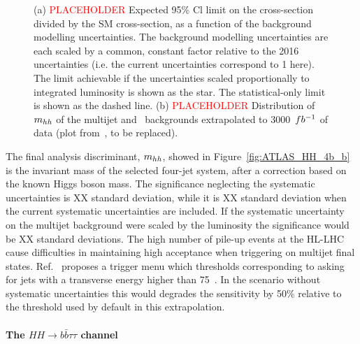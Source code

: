 \begin{figure}[!htb]
\centering 
{} 
\caption{(a) \textcolor{red}{PLACEHOLDER} Expected 95\% Cl limit on the cross-section divided by the SM cross-section, as a function of the background modelling uncertainties. The background modelling uncertainties are each scaled by a common, constant factor relative to the 2016 uncertainties (i.e. the current uncertainties correspond to 1 here). 
The limit achievable if the uncertainties scaled proportionally to integrated luminosity is shown as the star. 
The statistical-only limit is shown as the dashed line. (b) \textcolor{red}{PLACEHOLDER} Distribution of $m_{hh}$ of the multijet and \ttbar\ backgrounds extrapolated to 3000~$fb^{-1}$ of data (plot from~\cite{Aaboud:2018knk}, to be replaced).} 
\label{fig:ATLAS_HH_4b} 
\end{figure}

The final analysis discriminant, $m_{hh}$, showed in Figure~\ref{fig:ATLAS_HH_4b_b} is the invariant mass of the selected four-jet system, after a correction based on the known Higgs boson mass. The significance neglecting the systematic uncertainties is XX standard deviation, while it is XX standard deviation when the current systematic uncertainties are included. If the systematic uncertainty on the multijet background were scaled by the luminosity the significance would be XX standard deviations.
The high number of pile-up events at the HL-LHC cause difficulties in maintaining high acceptance when triggering on multijet final states. Ref.~\cite{Collaboration:2285584} proposes a trigger menu which thresholds corresponding to asking for jets with a transverse energy higher than 75~\UGeV. In the scenario without systematic uncertainties this would degrades the sensitivity by 50\% relative to the threshold used by default in this extrapolation.


%
\paragraph{The $HH \rightarrow b\bar{b}\tau\tau$ channel}

